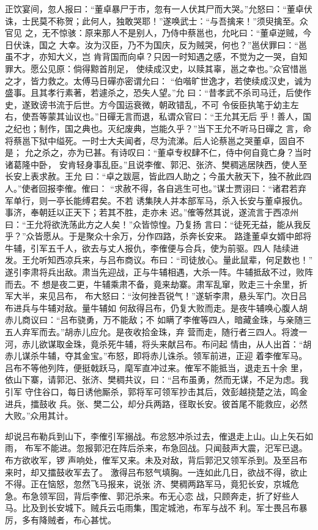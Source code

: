 正饮宴间，忽人报曰：“董卓暴尸于市，忽有一人伏其尸而大哭。”允怒曰：“董卓伏
诛，士民莫不称贺；此何人，独敢哭耶！”遂唤武士：“与吾擒来！”须臾擒至。众官见
之，无不惊骇：原来那人不是别人，乃侍中蔡邕也，允叱曰：“董卓逆贼，今日伏诛，国之
大幸。汝为汉臣，乃不为国庆，反为贼哭，何也？”邕伏罪曰：“邕虽不才，亦知大义，岂
肯背国而向卓？只因一时知遇之感，不觉为之一哭，自知罪大。愿公见原：倘得黥首刖足，
使续成汉史，以赎其辜，邕之幸也。”众官惜邕之才，皆力救之。太傅马日磾亦密谓允曰：
“伯喈旷世逸才，若使续成汉史，诚为盛事。且其孝行素著，若遽杀之，恐失人望。”允
曰：“昔孝武不杀司马迁，后使作史，遂致谤书流于后世。方今国运衰微，朝政错乱，不可
令佞臣执笔于幼主左右，使吾等蒙其讪议也。”日磾无言而退，私谓众官曰：“王允其无后
乎！善人，国之纪也；制作，国之典也。灭纪废典，岂能久乎？”当下王允不听马日磾之
言，命将蔡邕下狱中缢死。一时士大夫闻者，尽为流涕。后人论蔡邕之哭董卓，固自不是；
允之杀之，亦为已甚。有诗叹曰：“董卓专权肆不仁，侍中何自竟亡身？当时诸葛隆中卧，
安肯轻身事乱臣。”且说李傕、郭汜、张济、樊稠逃居陕西，使人至长安上表求赦。王允
曰：“卓之跋扈，皆此四人助之；今虽大赦天下，独不赦此四人。”使者回报李傕。傕曰：
“求赦不得，各自逃生可也。”谋士贾诩曰：“诸君若弃军单行，则一亭长能缚君矣。不若
诱集陕人并本部军马，杀入长安与董卓报仇。事济，奉朝廷以正天下；若其不胜，走亦未
迟。”傕等然其说，遂流言于西凉州曰：“王允将欲洗荡此方之人矣！”众皆惊惶。乃复扬
言曰：“徒死无益，能从我反乎？”众皆愿从。于是聚众十余万，分作四路，杀奔长安来。
路逢董卓女婿中郎将牛辅，引军五千人，欲去与丈人报仇，李傕便与合兵，使为前驱。四人
陆续进发。王允听知西凉兵来，与吕布商议。布曰：“司徒放心。量此鼠辈，何足数也！”
遂引李肃将兵出敌。肃当先迎战，正与牛辅相遇，大杀一阵。牛辅抵敌不过，败阵而去。不
想是夜二更，牛辅乘肃不备，竟来劫寨。肃军乱窜，败走三十余里，折军大半，来见吕布，
布大怒曰：“汝何挫吾锐气！”遂斩李肃，悬头军门。次日吕布进兵与牛辅对敌。量牛辅如
何敌得吕布，仍复大败而走。是夜牛辅唤心腹人胡赤儿商议曰：“吕布骁勇，万不能敌；不
如瞒了李傕等四人，暗藏金珠，与亲随三五人弃军而去。”胡赤儿应允。是夜收拾金珠，弃
营而走，随行者三四人。将渡一河，赤儿欲谋取金珠，竟杀死牛辅，将头来献吕布。布问起
情由，从人出首：“胡赤儿谋杀牛辅，夺其金宝。”布怒，即将赤儿诛杀。领军前进，正迎
着李傕军马。吕布不等他列阵，便挺戟跃马，麾军直冲过来。傕军不能抵当，退走五十余
里，依山下寨，请郭汜、张济、樊稠共议，曰：“吕布虽勇，然而无谋，不足为虑。我引军
守住谷口，每日诱他厮杀，郭将军可领军抄击其后，效彭越挠楚之法，鸣金进兵，擂鼓收
兵。张、樊二公，却分兵两路，径取长安。彼首尾不能救应，必然大败。”众用其计。

却说吕布勒兵到山下，李傕引军搦战。布忿怒冲杀过去，傕退走上山。山上矢石如雨，
布军不能进。忽报郭汜在阵后杀来，布急回战。只闻鼓声大震，汜军已退。布方欲收军，锣
声响处，傕军又来。未及对敌，背后郭汜又领军杀到。及至吕布来时，却又擂鼓收军去了。
激得吕布怒气填胸。一连如此几日，欲战不得，欲止不得。正在恼怒，忽然飞马报来，说张
济、樊稠两路军马，竟犯长安，京城危急。布急领军回，背后李傕、郭汜杀来。布无心恋
战，只顾奔走，折了好些人马。比及到长安城下。贼兵云屯雨集，围定城池，布军与战不
利。军士畏吕布暴厉，多有降贼者，布心甚忧。

